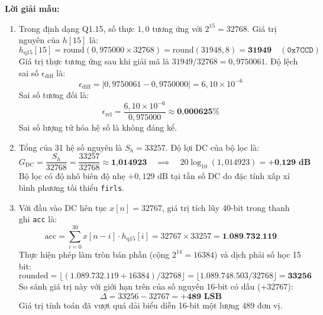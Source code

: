 \textbf{Lời giải mẫu:}
\begin{enumerate}[label=(\alph*)]
    \item Trong định dạng Q1.15, số thực $1{,}0$ tương ứng với $2^{15} = 32768$. Giá trị nguyên của $h[15]$ là:
    \begin{equation}
    h_{\text{q15}}[15] = \text{round}(0{,}975000 \times 32768) = \text{round}(31948{,}8) = \textbf{31949} \quad (\texttt{0x7CCD})
    \end{equation}
    Giá trị thực tương ứng sau khi giải mã là $31949 / 32768 = 0{,}9750061$. Độ lệch sai số $\epsilon_{\text{diff}}$ là:
    \begin{equation}
    \epsilon_{\text{diff}} = |0{,}9750061 - 0{,}9750000| = 6{,}10 \times 10^{-6}
    \end{equation}
    Sai số tương đối là:
    \begin{equation}
    \epsilon_{\text{rel}} = \frac{6{,}10 \times 10^{-6}}{0{,}975000} \approx \textbf{0{,}000625\%}
    \end{equation}
    Sai số lượng tử hóa hệ số là không đáng kể.
    \item Tổng của 31 hệ số nguyên là $S_h = 33257$. Độ lợi DC của bộ lọc là:
    \begin{equation}
    G_{\text{DC}} = \frac{S_h}{32768} = \frac{33257}{32768} \approx \textbf{1{,}014923} \quad \implies \quad 20 \log_{10}(1{,}014923) = \textbf{+0{,}129 dB}
    \end{equation}
    Bộ lọc có độ nhô biên độ nhẹ $+0{,}129\text{ dB}$ tại tần số DC do đặc tính xấp xỉ bình phương tối thiểu \texttt{firls}.
    \item Với đầu vào DC liên tục $x[n] = 32767$, giá trị tích lũy 40-bit trong thanh ghi \texttt{acc} là:
    \begin{equation}
    \text{acc} = \sum_{i=0}^{30} x[n-i] \cdot h_{\text{q15}}[i] = 32767 \times 33257 = \textbf{1.089.732.119}
    \end{equation}
    Thực hiện phép làm tròn bán phần (cộng $2^{14} = 16384$) và dịch phải số học 15 bit:
    \begin{equation}
    \text{rounded} = \lfloor (1.089.732.119 + 16384) / 32768 \rfloor = \lfloor 1.089.748.503 / 32768 \rfloor = \textbf{33256}
    \end{equation}
    So sánh giá trị này với giới hạn trên của số nguyên 16-bit có dấu ($+32767$):
    \begin{equation}
    \Delta = 33256 - 32767 = \textbf{+489 LSB}
    \end{equation}
    Giá trị tính toán đã vượt quá dải biểu diễn 16-bit một lượng 489 đơn vị.

\end{enumerate}
